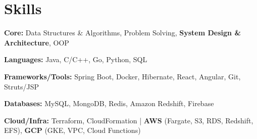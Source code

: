 \documentclass[a4paper,11pt]{article}
\begin{document}
    \section{Skills}\vspace{-0.3cm}
    \begin{multicols}{2}
        \setlength{\columnsep}{0.5cm}
        \begin{list}{}{
            \setlength{\leftmargin}{1.2em}
            \setlength{\labelsep}{0em}
            \setlength{\itemsep}{0.0cm}}
            \item \textbf{Core:} Data Structures \& Algorithms, Problem Solving, \textbf{System Design \& Architecture}, OOP
            \item \textbf{Languages:} Java, C/C++, Go, Python, SQL
            \item \textbf{Frameworks/Tools:} Spring Boot, Docker, Hibernate, React, Angular, Git, Struts/JSP
            \item \textbf{Databases:} MySQL, MongoDB, Redis, Amazon Redshift, Firebase
            \item \textbf{Cloud/Infra:} Terraform, CloudFormation | \textbf{AWS} (Fargate, S3, RDS, Redshift, EFS), \textbf{GCP} (GKE, VPC, Cloud Functions)
        \end{list}

    \end{multicols}
\end{document}
